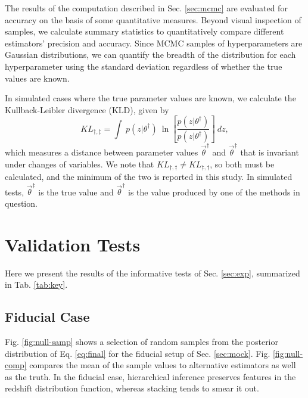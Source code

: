 \documentclass[preprint]{aastex}
\begin{document}
The results of the computation described in Sec. \ref{sec:mcmc} are evaluated 
for accuracy on the basis of some quantitative measures.  Beyond visual 
inspection of samples, we calculate summary statistics to quantitatively 
compare different estimators' precision and accuracy.  Since MCMC samples of 
hyperparameters are Gaussian distributions, we can quantify the breadth of the 
distribution for each hyperparameter using the standard deviation regardless of 
whether the true values are known.  

In simulated cases where the true parameter values are known, we calculate the 
Kullback-Leibler divergence (KLD), given by 
\begin{equation}
\label{eq:kl}
KL_{\dagger,\ddagger} = \int\ p(z|\theta^{\dagger})\ 
\ln\left[\frac{p(z|\theta^{\dagger})}{p(z|\theta^{\ddagger})}\right]\ dz,
\end{equation}
which measures a distance between parameter values $\vec{\theta}^{\dagger}$ and 
$\vec{\theta}^{\ddagger}$ that is invariant under changes of variables.  We 
note that $KL_{\dagger,\ddagger}\neq KL_{\ddagger,\dagger}$, so both must be 
calculated, and the minimum of the two is reported in this study.  In simulated 
tests, $\vec{\theta}^{\ddagger}$ is the true value and $\vec{\theta}^{\dagger}$ 
is the value produced by one of the methods in question.  

\clearpage
\section{Validation Tests}
\label{sec:valid}

Here we present the results of the informative tests of Sec. \ref{sec:exp}, 
summarized in Tab. \ref{tab:key}.  

\subsection{Fiducial Case}
\label{sec:null}

Fig. \ref{fig:null-samp} shows a selection of random samples from the posterior 
distribution of Eq. \ref{eq:final} for the fiducial setup of Sec. 
\ref{sec:mock}.  Fig. \ref{fig:null-comp} compares the mean of the sample 
values to alternative estimators as well as the truth.  In the fiducial case, 
hierarchical inference preserves features in the redshift distribution 
function, whereas stacking tends to smear it out.  
\end{document}
